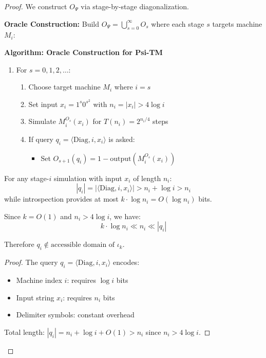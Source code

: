\documentclass[11pt]{article}
\begin{document}
\begin{proof}
We construct $O_\Psi$ via stage-by-stage diagonalization.

\textbf{Oracle Construction:}
Build $O_\Psi = \bigcup_{s=0}^{\infty} O_s$ where each stage $s$ targets machine $M_i$:

\textbf{Algorithm: Oracle Construction for Psi-TM}
\begin{enumerate}
\item For $s = 0, 1, 2, \ldots$:
   \begin{enumerate}
   \item Choose target machine $M_i$ where $i = s$
   \item Set input $x_i = 1^s 0^{s^2}$ with $n_i = |x_i| > 4\log i$
   \item Simulate $M_i^{O_s}(x_i)$ for $T(n_i) = 2^{n_i/4}$ steps
   \item If query $q_i = \langle \text{Diag}, i, x_i \rangle$ is asked:
      \begin{itemize}
      \item Set $O_{s+1}(q_i) = 1 - \text{output}(M_i^{O_s}(x_i))$
      \end{itemize}
   \end{enumerate}
\end{enumerate}

\begin{lemma}
\label{lem:non-circularity}
For any stage-$i$ simulation with input $x_i$ of length $n_i$:
$$|q_i| = |\langle \text{Diag}, i, x_i \rangle| > n_i + \log i > n_i$$
while introspection provides at most $k \cdot \log n_i = O(\log n_i)$ bits.

Since $k = O(1)$ and $n_i > 4\log i$, we have:
$$k \cdot \log n_i \ll n_i \ll |q_i|$$

Therefore $q_i \notin \text{accessible domain of } \iota_k$.
\end{lemma}

\begin{proof}
The query $q_i = \langle \text{Diag}, i, x_i \rangle$ encodes:
\begin{itemize}
\item Machine index $i$: requires $\log i$ bits
\item Input string $x_i$: requires $n_i$ bits  
\item Delimiter symbols: constant overhead
\end{itemize}

Total length: $|q_i| = n_i + \log i + O(1) > n_i$ since $n_i > 4\log i$.


\end{proof}
\end{proof}
\end{document}
